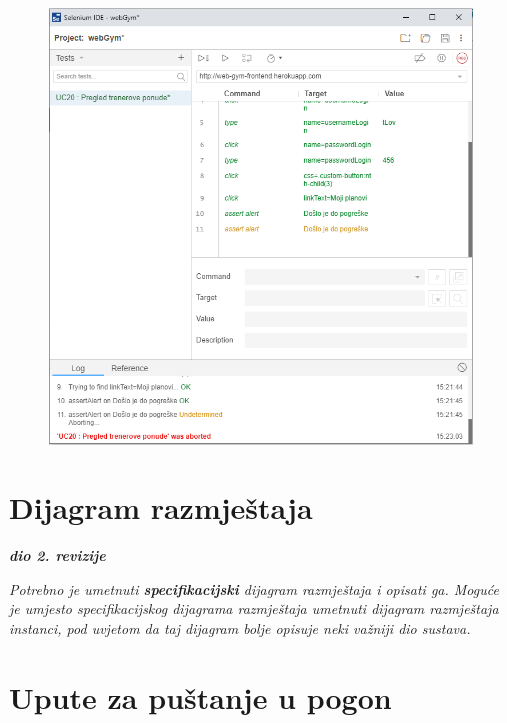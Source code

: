 					\begin{figure}[H]
        			\hspace*{-1.5cm}
        			\includegraphics[scale=0.5]{slike/error.PNG} %
        			\centering
        			\label{fig:promjene}
	        	\end{figure}
		 
			\eject 
			
			
			
		
		
		\section{Dijagram razmještaja}
			
			\textbf{\textit{dio 2. revizije}}
			
			 \textit{Potrebno je umetnuti \textbf{specifikacijski} dijagram razmještaja i opisati ga. Moguće je umjesto specifikacijskog dijagrama razmještaja umetnuti dijagram razmještaja instanci, pod uvjetom da taj dijagram bolje opisuje neki važniji dio sustava.}
			
			\eject 
		
		\section{Upute za puštanje u pogon}

